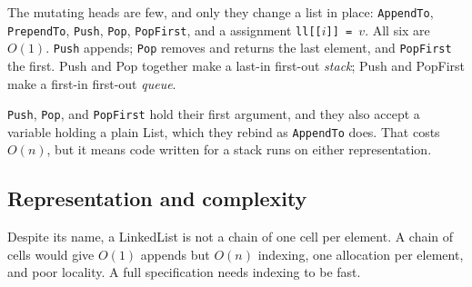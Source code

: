 The mutating heads are few, and only they change a list in place: \texttt{AppendTo},
\texttt{PrependTo}, \texttt{Push}, \texttt{Pop}, \texttt{PopFirst}, and a  assignment
\texttt{ll[[\(i\)]] = \(v\)}. All six are \(O(1)\). \texttt{Push} appends; \texttt{Pop} removes
and returns the last element, and \texttt{PopFirst} the first. Push and Pop together make a
last-in first-out \emph{stack}; Push and PopFirst make a first-in
first-out \emph{queue}.

\begin{codepairs}
\end{codepairs}

\texttt{Push}, \texttt{Pop}, and \texttt{PopFirst} hold their first argument, and they also accept a
variable holding a plain List, which they rebind as \texttt{AppendTo} does. That costs
\(O(n)\), but it means code written for a stack runs on either representation.

\subsection{Representation and complexity}
\label{ssec:ds-ll-repr}

Despite its name, a LinkedList is not a chain of one cell per element. A chain of
cells would give \(O(1)\) appends but \(O(n)\) indexing, one allocation per element,
and poor locality. A full  specification needs indexing to be fast.

